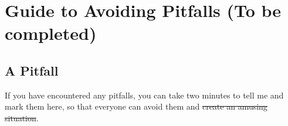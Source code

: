 \chapter{Guide to Avoiding Pitfalls (To be completed)}

\section{A Pitfall}
If you have encountered any pitfalls, you can take two minutes to tell me and mark them here, so that everyone can avoid them and \sout{create an amusing situation}.
